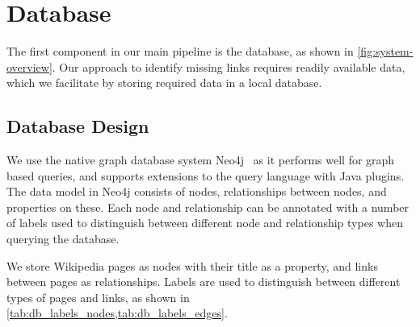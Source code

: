 \section{Database}\label{sec:db}
The first component in our main pipeline is the database, as shown in \cref{fig:system-overview}. Our approach to identify missing links requires readily available data, which we facilitate by storing required data in a local database.

\subsection{Database Design}\label{sec:db_design}
We use the native graph database system Neo4j~\cite{neo4j} as it performs well for graph based queries, and supports extensions to the query language with Java plugins. The data model in Neo4j consists of nodes, relationships between nodes, and properties on these. Each node and relationship can be annotated with a number of labels used to distinguish between different node and relationship types when querying the database.

We store Wikipedia pages as nodes with their title as a property, and links between pages as relationships. Labels are used to distinguish between different types of pages and links, as shown in \cref{tab:db_labels_nodes,tab:db_labels_edges}.

